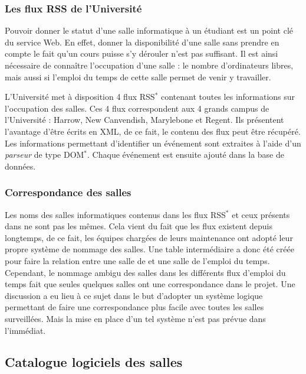 \subsubsection{Les flux RSS de l'Universit\'e}

Pouvoir donner le statut d'une salle informatique \`a un \'etudiant est un point cl\'e du service Web.
En effet, donner la disponibilit\'e d'une salle sans prendre en compte le fait qu'un cours puisse s'y d\'erouler n'est pas suffisant.
Il est ainsi n\'ecessaire de conna\^itre l'occupation d'une salle : le nombre d'ordinateurs libres, mais aussi si l'emploi du temps de cette salle permet de venir y travailler.

L'Universit\'e met \`a disposition 4 flux RSS$^*$ contenant toutes les informations sur l'occupation des salles.
Ces 4 flux correspondent aux 4 grands campus de l'Universit\'e : Harrow, New Canvendish, Marylebone et Regent.
Ils pr\'esentent l'avantage d'\^etre \'ecrits en XML, de ce fait, le contenu des flux peut \^etre r\'ecup\'er\'e.
Les informations permettant d'identifier un \'ev\'enement sont extraites \`a l'aide d'un \textit{parseur} de type DOM$^*$.
Chaque \'ev\'enement est ensuite ajout\'e dans la base de donn\'ees.

\subsubsection{Correspondance des salles}

Les noms des salles informatiques contenus dans les flux RSS$^*$ et ceux pr\'esents dans {\YuukouII} ne sont pas les m\^emes.
Cela vient du fait que les flux existent depuis longtemps, de ce fait, les \'equipes charg\'ees de leurs maintenance ont adopt\'e leur propre syst\`eme de nommage des salles.
Une table interm\'ediaire a donc \'et\'e cr\'e\'ee pour faire la relation entre une salle de {\YuukouII} et une salle de l'emploi du temps.
Cependant, le nommage ambigu des salles dans les diff\'erents flux d'emploi du temps fait que seules quelques salles ont une correspondance dans le projet.
Une discussion a eu lieu \`a ce sujet dans le but d'adopter un syst\`eme logique permettant de faire une correspondance plus facile avec toutes les salles surveill\'ees.
Mais la mise en place d'un tel syst\`eme n'est pas pr\'evue dans l'imm\'ediat.

\subsection{Catalogue logiciels des salles}
\label{section:catalogueLogiciel}

